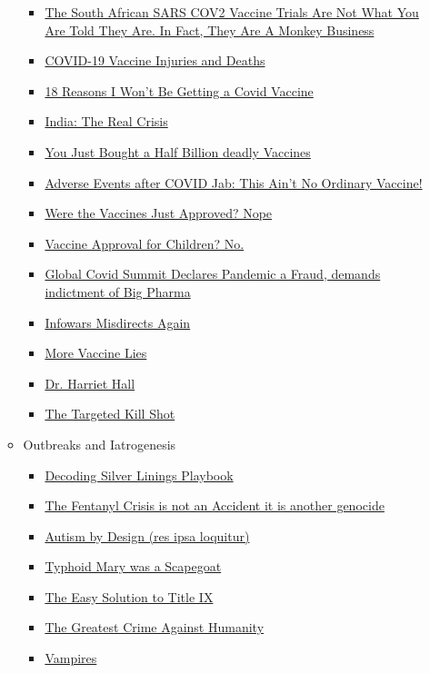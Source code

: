 \documentclass{article}
\newcommand{\insertmydocument}[2]{ %
  \item \href{http://www.mileswmathis.com/#2}{#1}
}
\begin{document}
\begin{itemize}
\begin{itemize}
\begin{itemize}
      \insertmydocument{The South African SARS COV2 Vaccine Trials Are Not What You Are Told They Are. In Fact, They Are A Monkey Business}{monkeybus.pdf}
      \insertmydocument{COVID-19 Vaccine Injuries and Deaths}{evidence-of-injury-mwm-1.pdf}
      \insertmydocument{18 Reasons I Won't Be Getting a Covid Vaccine}{covid8.pdf}
      \insertmydocument{India: The Real Crisis}{indiancrisis.pdf}
      \insertmydocument{You Just Bought a Half Billion deadly Vaccines}{theft.pdf}
      \insertmydocument{Adverse Events after COVID Jab: This Ain’t No Ordinary Vaccine!}{AE2.pdf}
      \insertmydocument{Were the Vaccines Just Approved? Nope}{vax.pdf}
      \insertmydocument{Vaccine Approval for Children? No.}{vaxx2.pdf}
      \insertmydocument{Global Covid Summit Declares Pandemic a Fraud, demands indictment of Big Pharma}{vax8.pdf}
      \insertmydocument{Infowars Misdirects Again}{tocsin2.pdf}
      \insertmydocument{More Vaccine Lies}{speaker.pdf}
      \insertmydocument{Dr. Harriet Hall}{harriet.pdf}
      \insertmydocument{The Targeted Kill Shot}{geno.pdf}
    \end{itemize}

    \item Outbreaks and Iatrogenesis
    \begin{itemize}

      \insertmydocument{Decoding Silver Linings Playbook}{silver.pdf}
      \insertmydocument{The Fentanyl Crisis is not an Accident it is another genocide}{opioid.pdf}
      \insertmydocument{Autism by Design (res ipsa loquitur)}{wheat.pdf}
      \insertmydocument{Typhoid Mary was a Scapegoat}{mary.pdf}
      \insertmydocument{The Easy Solution to Title IX}{strike.pdf}
      \insertmydocument{The Greatest Crime Against Humanity}{trans.pdf}
      \insertmydocument{Vampires}{vamp.pdf}

    \end{itemize}
  \end{itemize}
\end{itemize}
\end{document}
